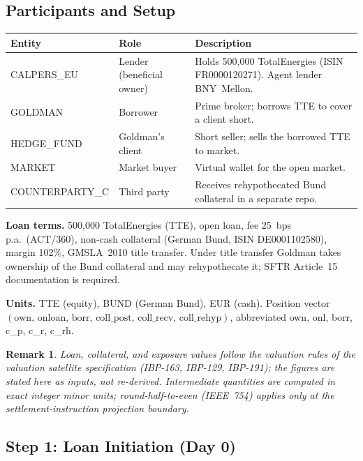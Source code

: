 \documentclass[11pt,a4paper]{article}
\newtheorem{remark}[definition]{Remark}
\begin{document}
\subsection{Participants and Setup}

\begin{center}\small
\begin{tabular}{l l p{7.2cm}}
\toprule
\textbf{Entity} & \textbf{Role} & \textbf{Description} \\
\midrule
CALPERS\_EU & Lender (beneficial owner) & Holds 500{,}000 TotalEnergies (ISIN FR0000120271). Agent lender BNY~Mellon. \\
GOLDMAN & Borrower & Prime broker; borrows TTE to cover a client short. \\
HEDGE\_FUND & Goldman's client & Short seller; sells the borrowed TTE to market. \\
MARKET & Market buyer & Virtual wallet for the open market. \\
COUNTERPARTY\_C & Third party & Receives rehypothecated Bund collateral in a separate repo. \\
\bottomrule
\end{tabular}
\end{center}

\noindent\textbf{Loan terms.} 500{,}000 TotalEnergies (TTE), open loan, fee 25~bps p.a.\ (ACT/360), non-cash collateral (German Bund, ISIN DE0001102580), margin 102\%, GMSLA~2010 title transfer. Under title transfer Goldman takes ownership of the Bund collateral and may rehypothecate it; SFTR Article~15 documentation is required.

\noindent\textbf{Units.} TTE (equity), BUND (German Bund), EUR (cash). Position vector $(\mathrm{own},\,\allowbreak\mathrm{onloan},\,\allowbreak\mathrm{borr},\,\allowbreak\mathrm{coll\_post},\,\allowbreak\mathrm{coll\_recv},\,\allowbreak\mathrm{coll\_rehyp})$, abbreviated own, onl, borr, c\_p, c\_r, c\_rh.

\begin{remark}
Loan, collateral, and exposure values follow the valuation rules of the valuation satellite specification (IBP-163, IBP-129, IBP-191); the figures are stated here as inputs, not re-derived. Intermediate quantities are computed in exact integer minor units; round-half-to-even (IEEE~754) applies only at the settlement-instruction projection boundary.
\end{remark}

\subsection{Step 1: Loan Initiation (Day 0)}
\label{sec:eu-step1}
\end{document}
